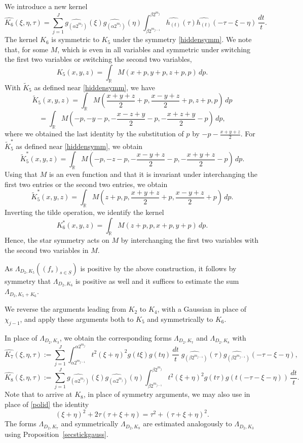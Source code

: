 \documentclass[12pt,reqno]{amsart}
\theoremstyle{plain}
\theoremstyle{definition}
\numberwithin{equation}{section}
\newcommand{\R}{{\mathbb R}}
\begin{document}
 We introduce a new kernel 
\[\widehat{K_6} (\xi,\eta,\tau)   = \sum_{j=1}^J\widehat{g_{(\alpha 2^{m_{j}})}}(\xi)\widehat{g_{(\alpha 2^{m_{j}})}}(\eta)   \int_{\beta 2^{m_{j-1}}}^{\beta 2^{m_{j}}}  \widehat{h_{(t)}}(\tau){\widehat{h_{(t)}}}(-\tau-\xi-\eta)  \, \frac{dt}{t}.  \]
The kernel $K_6$ is symmetric to $K_5$ under the symmetry \eqref{hiddensymm}.
 We note that, for some $M$, which is even in all variables and symmetric
 under switching the first two variables or switching the second two variables,
\[K_5(x,y,z)=\int_{\R} M(x+p,y+p,z+p,p)\, dp.\]
With $\widetilde{K}_5$ as defined near \eqref{hiddensymm}, we have
\[\widetilde{K}_5(x,y,z)=\int_\R M( \frac {x+y+z}2+p,\frac{x-y+z}2+p,z+p,p)\, dp\]
\[=\int_\R M(-p,-y-p,-\frac{x-z+y}2-p,-\frac{x+z+y}2-p)\, dp,\]
where we obtained the last identity by the  substitution of $p$ by $-p-\frac {x+y+z}2$.
For $\widetilde{K}_5^*$ as defined near \eqref{hiddensymm}, we obtain
\[\widetilde{K}_5^*(x,y,z)=\int_\R M(-p,-z-p,-\frac{x-y+z}2-p,-\frac{x+y+z}2-p)\, dp.\]
Using that $M$ is an even function and that it is invariant under interchanging
the first two entries or the second two entries, we obtain
\[
\widetilde{K}_5^*(x,y,z)=\int_\R M(z+p,p,\frac{x+y+z}2+p,\frac{x-y+z}2+p)\, dp.
\]
Inverting the tilde operation, we identify the kernel
\[{K}_6^*(x,y,z)=\int_{\R} M(z+p,p,x+p,y+p)\, dp.\]
Hence, the star symmetry acts on $M$ by interchanging the first two variables with the second two variables in $M$.

 

As $\Lambda_{D_2,K_5}((f_s)_{s\in S})$ is positive by the above
construction, it  follows by symmetry that  $\Lambda_{D_2,K_6}$ is positive as well and it suffices to estimate the sum $\Lambda_{D_2,K_5+K_6}$.

We reverse the arguments leading from
$K_2$ to $K_4$, with a Gaussian in place of $\chi_{j-1}$,
and apply these arguments both to $K_5$ and symmetrically to $K_6$.

In place of $\Lambda_{D_2,K_3}$, we obtain the corresponding forms
$\Lambda_{D_2,K_7}$  and $\Lambda_{D_2,K_8}$ with
\begin{equation*}
\widehat{K_7}(\xi,\eta,\tau):= \sum_{j=1}^J \int_{\alpha 2^{m_{j-1}}}^{{\alpha 2^{m_{j}}}} t^2(\xi+\eta)^2 g(t\xi) g(t\eta) \, \frac{dt}{t} \;\widehat{g_{(\beta 2^{m_{j-1}})}}(\tau)\widehat{g_{(\beta 2^{m_{j-1}})}}(-\tau-\xi-\eta),
\end{equation*}
\begin{equation*}
\widehat{K_8}(\xi,\eta,\tau):= \sum_{j=1}^J 
\widehat{g_{(\alpha 2^{m_{j}})}}(\xi)\widehat{g_{(\alpha 2^{m_{j}})}}(\eta)\int_{\beta 2^{m_{j-1}}}^{{\beta 2^{m_{j}}}} 
t^2(\xi+\eta)^2 g(t\tau) g(t(-\tau-\xi-\eta))  \,\frac{dt}{t}. \; 
\end{equation*}
Note that to arrive at $K_8$, in place of symmetry arguments, we 
may also use in place of \eqref{polid} the identity
$$(\xi+\eta)^2+2\tau(\tau+\xi+\eta) =\tau^2+(\tau+\xi+\eta)^2.$$
The forms $\Lambda_{D_2,K_{7}}$ and symmetrically $\Lambda_{D_2,K_{8}}$
are estimated analogously to $\Lambda_{D_2,K_3}$ using Proposition~\ref{secstickgauss}.
\end{document}
